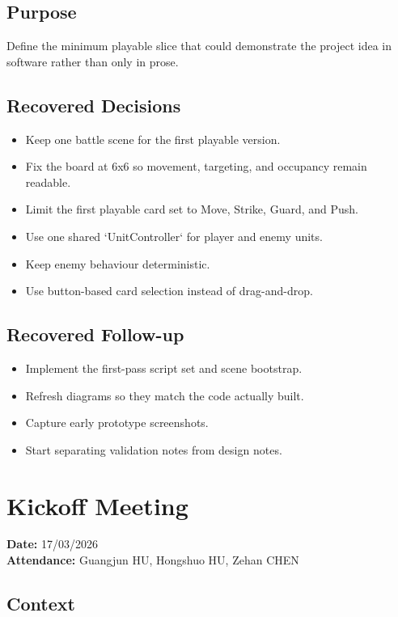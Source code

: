 \subsection{Purpose}

Define the minimum playable slice that could demonstrate the project idea in software rather than only in prose.

\subsection{Recovered Decisions}

\begin{itemize}
    \item Keep one battle scene for the first playable version.
    \item Fix the board at 6x6 so movement, targeting, and occupancy remain readable.
    \item Limit the first playable card set to Move, Strike, Guard, and Push.
    \item Use one shared `UnitController` for player and enemy units.
    \item Keep enemy behaviour deterministic.
    \item Use button-based card selection instead of drag-and-drop.
\end{itemize}

\subsection{Recovered Follow-up}

\begin{itemize}
    \item Implement the first-pass script set and scene bootstrap.
    \item Refresh diagrams so they match the code actually built.
    \item Capture early prototype screenshots.
    \item Start separating validation notes from design notes.
\end{itemize}

\section{Kickoff Meeting}

\textbf{Date:} 17/03/2026 \\
\textbf{Attendance:} Guangjun HU, Hongshuo HU, Zehan CHEN

\subsection{Context}

